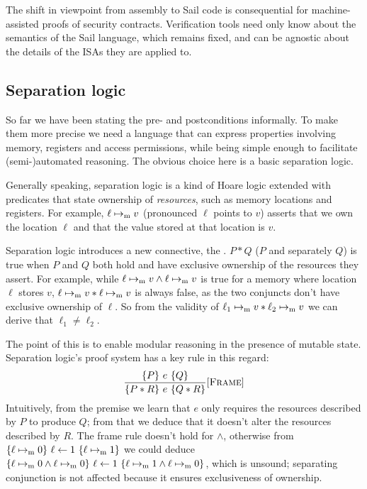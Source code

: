 

The shift in viewpoint from assembly to Sail code is consequential for machine-assisted proofs of security contracts. Verification tools need only know about the semantics of the Sail language, which remains fixed, and can be agnostic about the details of the ISAs they are applied to.

\subsection{Separation logic}

So far we have been stating the pre- and postconditions informally. To make them more precise we need a language that can express properties involving memory, registers and access permissions, while being simple enough to facilitate (semi-)automated reasoning. The obvious choice here is a basic separation logic.

Generally speaking, separation logic is a kind of Hoare logic extended with predicates that state ownership of \emph{resources}, such as memory locations and registers. For example, \(\ell \mapsto_{\mathrm{m}} v\) (pronounced \(\ell\) points to \(v\)) asserts that we own the location \(\ell\) and that the value stored at that location is \(v\).

Separation logic introduces a new connective, the . \(P \ast Q\) (\(P\) and separately \(Q\)) is true when \(P\) and \(Q\) both hold and have exclusive ownership of the resources they assert. For example, while \(\ell \mapsto_{\mathrm{m}} v \wedge \ell \mapsto_{\mathrm{m}} v\) is true for a memory where location \(\ell\) stores \(v\), \(\ell \mapsto_{\mathrm{m}} v \ast \ell \mapsto_{\mathrm{m}} v\) is always false, as the two conjuncts don't have exclusive ownership of \(\ell\). So from the validity of \(\ell_1 \mapsto_{\mathrm{m}} v \ast \ell_2 \mapsto_{\mathrm{m}} v\) we can derive that \(\ell_1 \neq \ell_2\).

The point of this is to enable modular reasoning in the presence of mutable state. Separation logic's proof system has a key rule in this regard:
\[ \frac{\hoare{P}{e}{Q}}{\hoare{P \ast R}{e}{Q \ast R}}[\textsc{Frame}] \]
Intuitively, from the premise we learn that \(e\) only requires the resources described by \(P\) to produce \(Q\); from that we deduce that it doesn't alter the resources described by \(R\). The frame rule doesn't hold for \(\wedge\), otherwise from \(\hoare{\ell \ptom 0}{\ell \leftarrow 1}{\ell \ptom 1}\) we could deduce \(\hoare{\ell \ptom 0 \wedge \ell \ptom 0}{\ell \leftarrow 1}{\ell \ptom 1 \wedge \ell \ptom 0}\), which is unsound; separating conjunction is not affected because it ensures exclusiveness of ownership.

